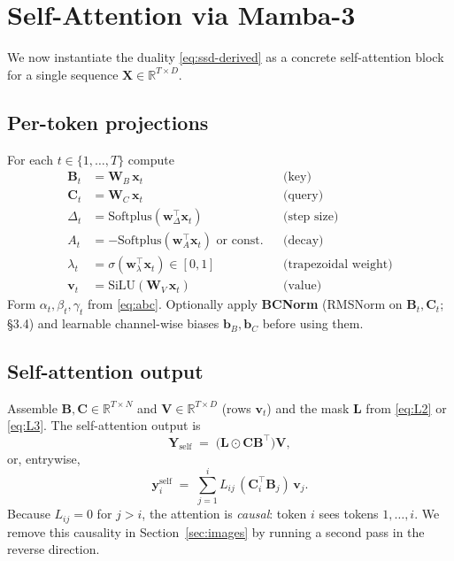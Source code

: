 \documentclass[11pt,a4paper]{article}
\begin{document}
\section{Self-Attention via Mamba-3}
\label{sec:self}

We now instantiate the duality \eqref{eq:ssd-derived} as a concrete
self-attention block for a single sequence
$\bm{X}\in\mathbb{R}^{T\times D}$.

\subsection{Per-token projections}

For each $t\in\{1,\dots,T\}$ compute
\begin{align}
  \bm{B}_t &= \bm{W}_B\,\bm{x}_t        & &\text{(key)} \\
  \bm{C}_t &= \bm{W}_C\,\bm{x}_t        & &\text{(query)} \\
  \Delta_t &= \mathrm{Softplus}(\bm{w}_\Delta^\top\bm{x}_t) & &\text{(step size)}\\
  A_t &= -\mathrm{Softplus}(\bm{w}_A^\top\bm{x}_t) \text{ or const.} & &\text{(decay)} \\
  \lambda_t &= \sigma(\bm{w}_\lambda^\top\bm{x}_t)\in[0,1] & &\text{(trapezoidal weight)} \\
  \bm{v}_t &= \mathrm{SiLU}(\bm{W}_V\,\bm{x}_t)         & &\text{(value)}
\end{align}
Form $\alpha_t,\beta_t,\gamma_t$ from \eqref{eq:abc}. Optionally apply
\textbf{BCNorm} (RMSNorm on $\bm{B}_t,\bm{C}_t$; \cite{mamba3}
\S 3.4) and learnable channel-wise biases $\bm{b}_B, \bm{b}_C$ before
using them.

\subsection{Self-attention output}

Assemble $\bm{B},\bm{C}\in\mathbb{R}^{T\times N}$ and
$\bm{V}\in\mathbb{R}^{T\times D}$ (rows $\bm{v}_t$) and the mask
$\bm{L}$ from \eqref{eq:L2} or \eqref{eq:L3}. The self-attention
output is
\begin{equation}\label{eq:self-out}
  \bm{Y}_{\text{self}} \;=\; \bigl(\bm{L}\odot\bm{C}\bm{B}^\top\bigr)\bm{V},
\end{equation}
or, entrywise,
\begin{equation}\label{eq:self-entry}
  \bm{y}_i^{\text{self}} \;=\; \sum_{j=1}^{i} L_{ij}\,(\bm{C}_i^\top \bm{B}_j)\,\bm{v}_j.
\end{equation}
Because $L_{ij}=0$ for $j>i$, the attention is \emph{causal}: token
$i$ sees tokens $1,\dots,i$. We remove this causality in
Section~\ref{sec:images} by running a second pass in the reverse
direction.
\end{document}
